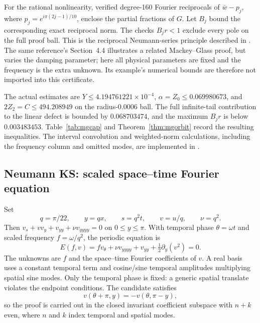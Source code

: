 \documentclass[11pt]{article}
\begin{document}
For the rational nonlinearity, verified degree-160 Fourier reciprocals of
$\bar w-p_j$, where $p_j=e^{i\pi(2j-1)/10}$, enclose the partial fractions of
$G$. Let $B_j$ bound the corresponding exact reciprocal norm. The checks
$B_jr<1$ exclude every pole on the full proof ball. This is the reciprocal
Neumann-series principle described in \citet[Remark~2.1]{validatedDFT2026}.
The same reference's Section~4.4 illustrates a related Mackey--Glass proof,
but varies the damping parameter; here all physical parameters are fixed and
the frequency is the extra unknown. Its example's numerical bounds are
therefore not imported into this certificate.

The actual estimates are $Y\leq4.194761221\times10^{-4}$,
$\alpha=Z_0\leq0.069980673$, and $2Z_2=C\leq494.208949$ on the
radius-$0.0006$ ball. The full infinite-tail contribution to the linear defect
is bounded by $0.068703474$, and the maximum $B_jr$ is below $0.003483453$.
Table~\ref{tab:mgcap} and Theorem~\ref{thm:mgorbit} record the resulting
inequalities. The interval convolution and weighted-norm calculations,
including the frequency column and omitted modes, are implemented in
.

\subsection{Neumann KS: scaled space--time Fourier equation}
\label{sec:kscap}
Set
\begin{equation}
 q=\pi/22,\qquad y=qx,\qquad s=q^2t,\qquad v=u/q,
 \qquad \nu=q^2.
\end{equation}
Then $v_s+vv_y+v_{yy}+\nu v_{yyyy}=0$ on $0\leq y\leq\pi$. With temporal phase $\theta=\omega t$ and scaled frequency $f=\omega/q^2$, the periodic equation is
\begin{equation}
 E(f,v)=f v_\theta+\nu v_{yyyy}+v_{yy}+\tfrac12\partial_y(v^2)=0.
 \label{eq:ksfourier}
\end{equation}
The unknowns are $f$ and the space--time Fourier coefficients of $v$. A real basis uses a constant temporal term and cosine/sine temporal amplitudes multiplying spatial sine modes. Only the temporal phase is fixed: a generic spatial translate violates the endpoint conditions. The candidate satisfies
\begin{equation}
 v(\theta+\pi,y)=-v(\theta,\pi-y),
\end{equation}
so the proof is carried out in the closed invariant coefficient subspace with $n+k$ even, where $n$ and $k$ index temporal and spatial modes.
\end{document}
